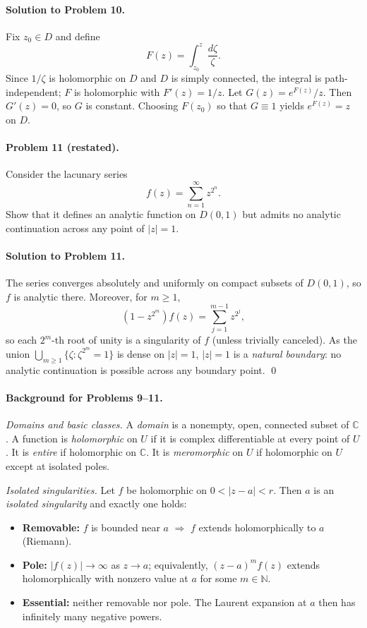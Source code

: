 \documentclass[11pt,a4paper]{article}
\theoremstyle{definition}
\theoremstyle{definition}
\theoremstyle{plain}
\theoremstyle{remark}
\begin{document}
\medskip
\paragraph{Solution to Problem 10.}
Fix $z_0\in D$ and define
\[
F(z)=\int_{z_0}^{z}\frac{d\zeta}{\zeta}.
\]
Since $1/\zeta$ is holomorphic on $D$ and $D$ is simply connected, the integral is path-independent; $F$ is holomorphic with $F'(z)=1/z$.
Let $G(z)=e^{F(z)}/z$. Then $G'(z)=0$, so $G$ is constant. Choosing $F(z_0)$ so that $G\equiv 1$ yields $e^{F(z)}=z$ on $D$.

\bigskip
\paragraph{Problem 11 (restated).}
Consider the lacunary series
\[
f(z)=\sum_{n=1}^{\infty} z^{2^{n}} .
\]
Show that it defines an analytic function on $D(0,1)$ but admits no analytic continuation across any point of $|z|=1$.

\medskip
\paragraph{Solution to Problem 11.}
The series converges absolutely and uniformly on compact subsets of $D(0,1)$, so $f$ is analytic there.
Moreover, for $m\ge 1$,
\[
(1-z^{2^{m}})f(z)=\sum_{j=1}^{m-1} z^{2^{j}},
\]
so each $2^{m}$-th root of unity is a singularity of $f$ (unless trivially canceled).
As the union $\bigcup_{m\ge 1}\{\zeta:\zeta^{2^{m}}=1\}$ is dense on $|z|=1$, $|z|=1$ is a \emph{natural boundary}:
no analytic continuation is possible across any boundary point.
\qed


\paragraph{Background for Problems 9--11.}

\emph{Domains and basic classes.}
A \emph{domain} is a nonempty, open, connected subset of $\mathbb C$.
A function is \emph{holomorphic} on $U$ if it is complex differentiable at every point of $U$.
It is \emph{entire} if holomorphic on $\mathbb C$.
It is \emph{meromorphic} on $U$ if holomorphic on $U$ except at isolated poles.

\medskip
\emph{Isolated singularities.}
Let $f$ be holomorphic on $0<|z-a|<r$. Then $a$ is an \emph{isolated singularity} and exactly one holds:
\begin{itemize}
	\item \textbf{Removable:} $f$ is bounded near $a$ $\Rightarrow$ $f$ extends holomorphically to $a$ (Riemann).
	\item \textbf{Pole:} $|f(z)|\to\infty$ as $z\to a$; equivalently, $(z-a)^m f(z)$ extends holomorphically with nonzero value at $a$ for some $m\in\mathbb N$.
	\item \textbf{Essential:} neither removable nor pole. The Laurent expansion at $a$ then has infinitely many negative powers.
\end{itemize}
\end{document}
